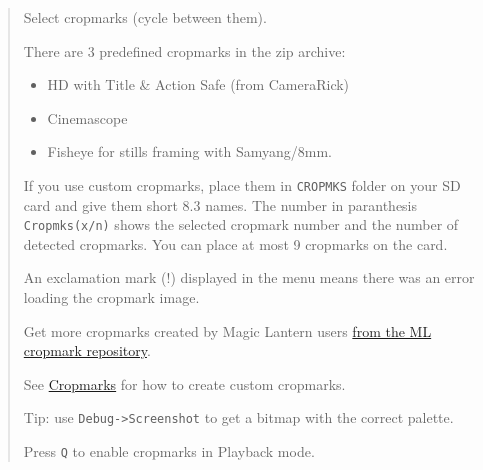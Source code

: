 \documentclass[a4paper,english]{article}
\begin{document}
\begin{quote}

Select cropmarks (cycle between them).

There are 3 predefined cropmarks in the zip archive:
%
\begin{itemize}

\item HD with Title \& Action Safe (from CameraRick)

\item Cinemascope

\item Fisheye for stills framing with Samyang/8mm.

\end{itemize}
\begin{figure}
\noindent{}
\end{figure}

If you use custom cropmarks, place them in \texttt{CROPMKS} folder on your SD card and give them short 8.3 names. The number in paranthesis \texttt{Cropmks(x/n)} shows the selected cropmark number and the number of detected cropmarks. You can place at most 9 cropmarks on the card.

An exclamation mark (!) displayed in the menu means there was an error loading the cropmark image.

Get more cropmarks created by Magic Lantern users \href{http://www.sawomedia.de/magiclantern/cropmarks/}{from the ML cropmark repository}.

See \href{http://magiclantern.wikia.com/wiki/Cropmarks}{Cropmarks} for how to create custom cropmarks.

Tip: use \texttt{Debug->Screenshot} to get a bitmap with the correct palette.

Press \texttt{Q} to enable cropmarks in Playback mode.

\end{quote}
\end{document}
